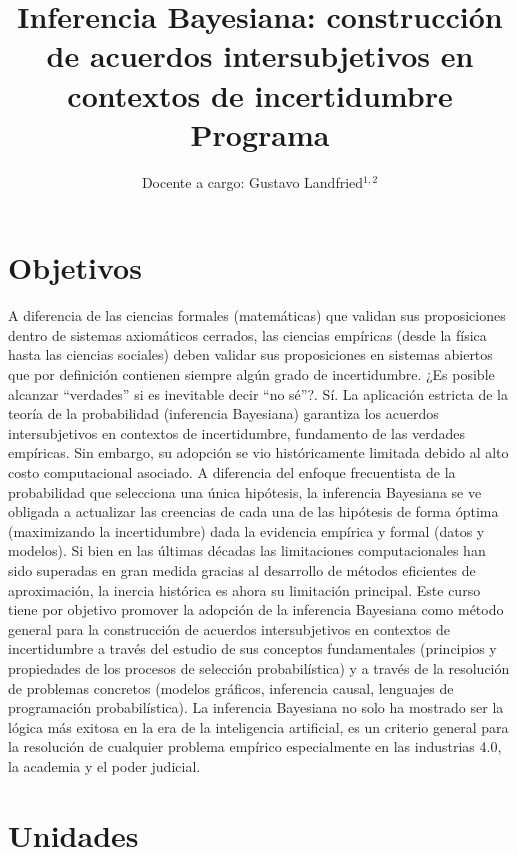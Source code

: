 \documentclass[10pt]{article}
\title{\huge Inferencia Bayesiana: construcción de acuerdos intersubjetivos en contextos de incertidumbre  \\[0.4cm]  \LARGE Programa}
\author{Docente a cargo: Gustavo Landfried$^{1,2}$}
\affil{\small 1. Bayes de las Provincias Unidas del Sur }
\affil{\vspace{-0.2cm}\small 2. Laboratorio Pacha Pampas}
\affil[]{Correspondencia: \texttt{glandfried@dc.uba.ar}, \texttt{bayesdelsur@gmail.com}}
\begin{document}
\maketitle

\section{Objetivos}

A diferencia de las ciencias formales (matemáticas) que validan sus proposiciones dentro de sistemas axiomáticos cerrados, las ciencias empíricas (desde la física hasta las ciencias sociales) deben validar sus proposiciones en sistemas abiertos que por definición contienen siempre algún grado de incertidumbre. ¿Es posible alcanzar ``verdades'' si es inevitable decir ``no sé''?. Sí. La aplicación estricta de la teoría de la probabilidad (inferencia Bayesiana) garantiza los acuerdos intersubjetivos en contextos de incertidumbre, fundamento de las verdades empíricas. Sin embargo, su adopción se vio históricamente limitada debido al alto costo computacional asociado. A diferencia del enfoque frecuentista de la probabilidad que selecciona una única hipótesis, la inferencia Bayesiana se ve obligada a actualizar las creencias de cada una de las hipótesis de forma óptima (maximizando la incertidumbre) dada la evidencia empírica y formal (datos y modelos). Si bien en las últimas décadas las limitaciones computacionales han sido superadas en gran medida gracias al desarrollo de métodos eficientes de aproximación, la inercia histórica es ahora su limitación principal. Este curso tiene por objetivo promover la adopción de la inferencia Bayesiana como método general para la construcción de acuerdos intersubjetivos en contextos de incertidumbre a través del estudio de sus conceptos fundamentales (principios y propiedades de los procesos de selección probabilística) y a través de la resolución de problemas concretos (modelos gráficos, inferencia causal, lenguajes de programación probabilística). La inferencia Bayesiana no solo ha mostrado ser la lógica más exitosa en la era de la inteligencia artificial, es un criterio general para la resolución de cualquier problema empírico especialmente en las industrias 4.0, la academia y el poder judicial.

\section{Unidades}
\end{document}
